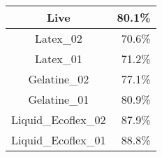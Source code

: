 
\begin{tabular}{ c   r }
    Live               &  80.1\% \\ \hline\hline
    Latex\_02           & 70.6\% \\
    Latex\_01           & 71.2\% \\
    Gelatine\_02        & 77.1\% \\
    Gelatine\_01        & 80.9\% \\
    Liquid\_Ecoflex\_02 & 87.9\% \\
    Liquid\_Ecoflex\_01 & 88.8\%
\end{tabular}